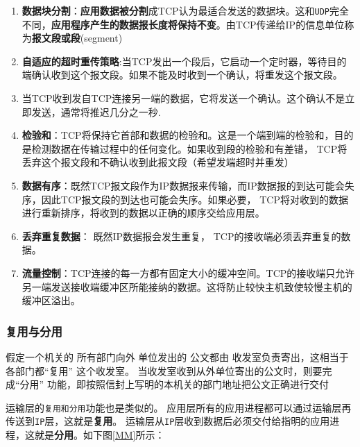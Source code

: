 \documentclass[UTF8,a4paper,8pt]{ctexbook}
\begin{document}
				\begin{enumerate}
					\item \textbf{数据块分割}：\textbf{应用数据被分割}成TCP认为最适合发送的数据块。这和\verb|UDP|完全不同，\textbf{应用程序产生的数据报长度将保持不变}。由TCP传递给IP的信息单位称为\textbf{报文段或段}(segment)
					
					\item \textbf{自适应的超时重传策略}:当TCP发出一个段后，它启动一个定时器，等待目的端确认收到这个报文段。如果不能及时收到一个确认，将重发这个报文段。
					
					\item 当TCP收到发自TCP连接另一端的数据，它将发送一个确认。这个确认不是立即发送，通常将推迟几分之一秒.
					
					\item \textbf{检验和}：TCP将保持它首部和数据的检验和。这是一个端到端的检验和，目的是检测数据在传输过程中的任何变化。如果收到段的检验和有差错， TCP将丢弃这个报文段和不确认收到此报文段（希望发端超时并重发）
					
					\item \textbf{数据有序}：既然TCP报文段作为IP数据报来传输，而IP数据报的到达可能会失序，因此TCP报文段的到达也可能会失序。如果必要， TCP将对收到的数据进行重新排序，将收到的数据以正确的顺序交给应用层。
					
					\item \textbf{丢弃重复数据}： 既然IP数据报会发生重复， TCP的接收端必须丢弃重复的数据。
					
					\item \textbf{流量控制}：TCP连接的每一方都有固定大小的缓冲空间。TCP的接收端只允许另一端发送接收端缓冲区所能接纳的数据。这将防止较快主机致使较慢主机的缓冲区溢出。
				\end{enumerate}
				
			\subsubsection{复用与分用}
				假定一个机关的 所有部门向外 单位发出的 公文都由 收发室负责寄出，这相当于各部门都“复用” 这个收发室。 当收发室收到从外单位寄出的公文时，则要完成“分用” 功能，即按照信封上写明的本机关的部门地址把公文正确进行交付
				
				运输层的\verb|复用和分用|功能也是类似的。 应用层所有的应用进程都可以通过运输层再传送到\verb|IP|层，这就是\textbf{复用}。 运输层从\verb|IP|层收到数据后必须交付给指明的应用进程，这就是\textbf{分用}。如下图\ref{MM}所示：
				
\end{document}
